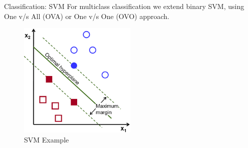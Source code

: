 \documentclass[10pt]{beamer}
\begin{document}
\begin{frame}{Classification: SVM}
For multiclass classification we extend binary SVM, using One v/s All (OVA) or One v/s One (OVO) approach. 
\begin{figure}[b]
\caption{SVM Example \cite{svm}}
\centering
\includegraphics[width=0.5\textwidth]{svm}
\end{figure}
\end{frame}
\end{document}
